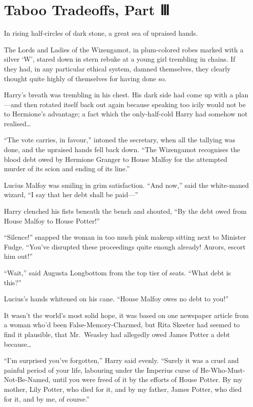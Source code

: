 \chapter{Taboo Tradeoffs, Part Ⅲ}\label{taboo-tradeoffs-part}

In rising half-circles of dark stone, a great sea of upraised hands.

The Lords and Ladies of the Wizengamot, in plum-colored robes marked
with a silver `W', stared down in stern rebuke at a young girl trembling
in chains. If they had, in any particular ethical system, damned
themselves, they clearly thought quite highly of themselves for having
done so.

Harry's breath was trembling in his chest. His dark side had come up
with a plan---and then rotated itself back out again because speaking
too icily would not be to Hermione's advantage; a fact which the
only-half-cold Harry had somehow not realised\ldots{}

``The vote carries, in favour,'' intoned the secretary, when all the
tallying was done, and the upraised hands fell back down. ``The
Wizengamot recognises the blood debt owed by Hermione Granger to House
Malfoy for the attempted murder of its scion and ending of its line.''

Lucius Malfoy was smiling in grim satisfaction. ``And now,'' said the
white-maned wizard, ``I say that her debt shall be paid---''

Harry clenched his fists beneath the bench and shouted, ``By the debt
owed from House Malfoy to House Potter!''

``Silence!'' snapped the woman in too much pink makeup sitting next to
Minister Fudge. ``You've disrupted these proceedings quite enough
already! Aurors, escort him out!''

``Wait,'' said Augusta Longbottom from the top tier of seats. ``What
debt is this?''

Lucius's hands whitened on his cane. ``House Malfoy owes no debt to
you!''

It wasn't the world's most solid hope, it was based on one newspaper
article from a woman who'd been False-Memory-Charmed, but Rita Skeeter
had seemed to find it plausible, that Mr.~Weasley had allegedly owed
James Potter a debt because\ldots{}

``I'm surprised you've forgotten,'' Harry said evenly. ``Surely it was a
cruel and painful period of your life, labouring under the Imperius
curse of He-Who-Must-Not-Be-Named, until you were freed of it by the
efforts of House Potter. By my mother, Lily Potter, who died for it, and
by my father, James Potter, who died for it, and by me, of course.''

